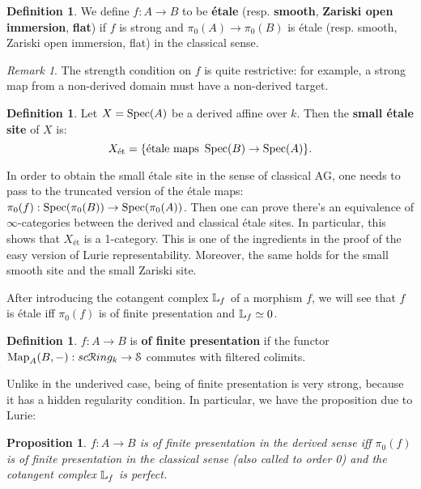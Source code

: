 \documentclass[10pt,a4paper,reqno,oneside]{book} %
\theoremstyle{plain}
\newtheorem{prop}[thm]{Proposition}
\theoremstyle{definition}
\newtheorem{defin}[thm]{Definition}
\theoremstyle{remark}
\newtheorem{rem}[thm]{Remark}
\numberwithin{equation}{section}
\begin{document}
\begin{defin}
\label{def:fav_morphisms}
We define $f: A \to B$ to be \textbf{\'{e}tale} (resp. \textbf{smooth}, \textbf{Zariski open immersion}, \textbf{flat})
if $f$ is strong and $\pi_0(A) \to \pi_0(B)$ is \'{e}tale (resp. smooth, Zariski open immersion, flat) in the classical sense.
\end{defin}

\begin{rem}
The strength condition on $f$ is quite restrictive: for example, a strong map from a non-derived domain must have a non-derived
target.
\end{rem}

\begin{defin}
Let $X = \operatorname{Spec}(A)$ be a derived affine over $k$. Then the \textbf{small \'{e}tale site} of $X$ is:
\[	X_{\text{\'{e}t}} = \{\text{\'{e}tale maps }\operatorname{Spec}(B) \to \operatorname{Spec}(A)\}.	\]
\end{defin}

In order to obtain the small \'{e}tale site in the sense of classical AG, one needs to pass to the truncated version
of the \'etale maps: $\pi_0(f) : \operatorname{Spec}(\pi_0(B)) \to \operatorname{Spec}(\pi_0(A))$. Then one can prove there's an equivalence of 
$\infty$-categories between the derived and classical \'etale sites. In particular, this shows that 
$X_{\text{\'{e}t}}$ is a 1-category. This is one of the ingredients in the proof of the easy version
of Lurie representability. Moreover, the same holds for the small smooth site and the small Zariski site.

After introducing the cotangent complex $\mathbb L_f$ of a morphism $f$, we will see that $f$ is \'{e}tale iff $\pi_0(f)$ 
is of finite presentation and $\mathbb L_f \simeq 0$.

\begin{defin}
$f:A \to B$ is \textbf{of finite presentation} if the functor $\operatorname{Map}_A(B, - ) : sc\mathcal R ing_k \to \mathcal S$ commutes with
filtered colimits. 
\end{defin}

Unlike in the underived case, being of finite presentation is very strong, because it has a hidden regularity condition.
In particular, we have the proposition due to Lurie:

\begin{prop}
$f: A \to B$ is of finite presentation in the derived sense iff $\pi_0(f)$ is of finite presentation in the classical sense
(also called to order 0) and the cotangent complex $\mathbb L_f$ is perfect.
\end{prop}
\end{document}
